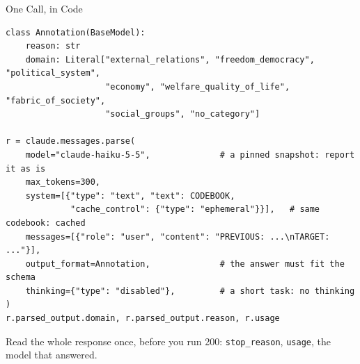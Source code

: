 \begin{frame}[fragile]{One Call, in Code}

\scriptsize
\begin{verbatim}
class Annotation(BaseModel):
    reason: str
    domain: Literal["external_relations", "freedom_democracy", "political_system",
                    "economy", "welfare_quality_of_life", "fabric_of_society",
                    "social_groups", "no_category"]

r = claude.messages.parse(
    model="claude-haiku-5-5",              # a pinned snapshot: report it as is
    max_tokens=300,
    system=[{"type": "text", "text": CODEBOOK,
             "cache_control": {"type": "ephemeral"}}],   # same codebook: cached
    messages=[{"role": "user", "content": "PREVIOUS: ...\nTARGET: ..."}],
    output_format=Annotation,              # the answer must fit the schema
    thinking={"type": "disabled"},         # a short task: no thinking
)
r.parsed_output.domain, r.parsed_output.reason, r.usage
\end{verbatim}

\vspace{0.2cm}
\small
Read the whole response once, before you run 200: \texttt{stop\_reason}, \texttt{usage}, the model that answered.

\end{frame}

